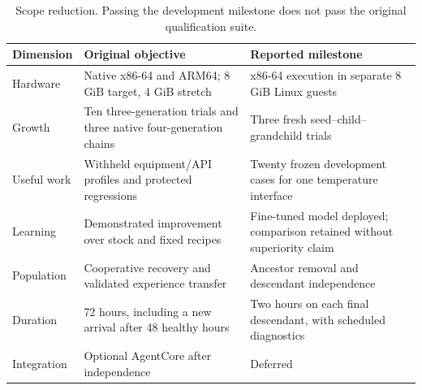 \documentclass[11pt,letterpaper]{article}
\begin{document}
\begin{table}[htbp]
\centering\small
\caption{Scope reduction. Passing the development milestone does not pass the
original qualification suite.}
\label{tab:scope}
\begin{tabular}{@{}p{}p{}p{}@{}}
\toprule
Dimension & Original objective & Reported milestone\\
\midrule
Hardware & Native x86-64 and ARM64; 8 GiB target, 4 GiB stretch &
x86-64 execution in separate 8 GiB Linux guests\\
Growth & Ten three-generation trials and three native four-generation chains &
Three fresh seed--child--grandchild trials\\
Useful work & Withheld equipment/API profiles and protected regressions &
Twenty frozen development cases for one temperature interface\\
Learning & Demonstrated improvement over stock and fixed recipes &
Fine-tuned model deployed; comparison retained without superiority claim\\
Population & Cooperative recovery and validated experience transfer &
Ancestor removal and descendant independence\\
Duration & 72 hours, including a new arrival after 48 healthy hours &
Two hours on each final descendant, with scheduled diagnostics\\
Integration & Optional AgentCore after independence &
Deferred\\
\bottomrule
\end{tabular}
\end{table}
\end{document}
